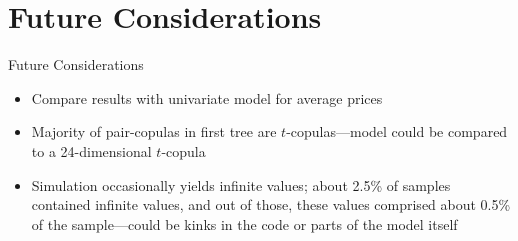 \section{Future Considerations}
\label{sec:future}

\begin{frame}{Future Considerations}{}
  \begin{itemize}
  \item<2-> Compare results with univariate model for average prices
  \item<3-> Majority of pair-copulas in first tree are \(t\)-copulas---model could be compared to a 24-dimensional \(t\)-copula
  \item<4-> Simulation occasionally yields infinite values; about 2.5\% of samples contained infinite values, and out of those, these values comprised about 0.5\% of the sample---could be kinks in the code or parts of the model itself
  \end{itemize}
\end{frame}

